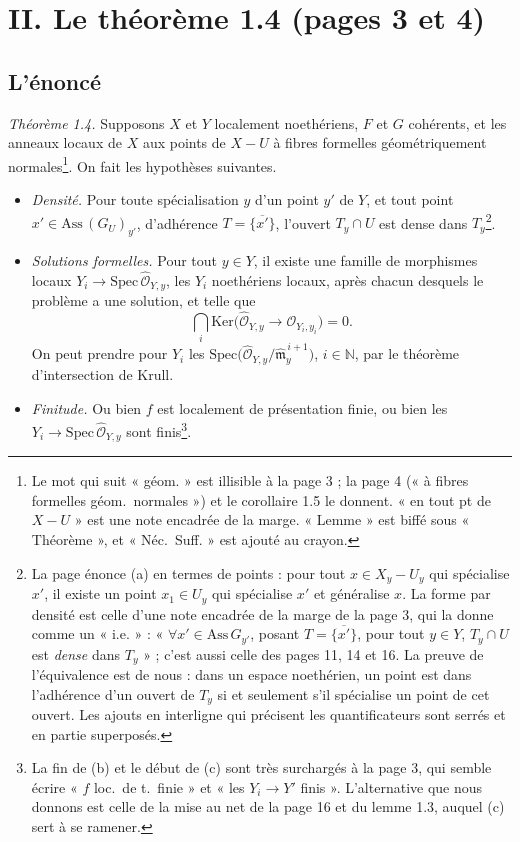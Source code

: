\documentclass[11pt,a4paper]{article}
\begin{document}
\section*{II. Le théorème 1.4 (pages 3 et 4)}

\subsection*{L'énoncé}

\emph{Théorème 1.4.} Supposons $X$ et $Y$ localement noethériens, $F$ et
$G$ cohérents, et les anneaux locaux de $X$ aux points de $X - U$ à fibres
formelles géométriquement normales\footnote{Le mot qui suit « géom. » est
illisible à la page 3 ; la page 4 (« à fibres formelles géom.\ normales ») et
le corollaire 1.5 le donnent. « en tout pt de $X - U$ » est une note encadrée
de la marge. « Lemme » est biffé sous « Théorème », et « Néc.\ Suff. » est
ajouté au crayon.}. On fait les hypothèses suivantes.

\begin{itemize}
  \item[(a)] \emph{Densité.} Pour toute spécialisation $y$ d'un point $y'$ de
  $Y$, et tout point $x' \in \mathrm{Ass}\,(G_U)_{y'}$, d'adhérence
  $T = \overline{\{x'\}}$, l'ouvert $T_y \cap U$ est dense dans
  $T_y$\footnote{La page énonce (a) en termes de points : pour tout
  $x \in X_y - U_y$ qui spécialise $x'$, il existe un point $x_1 \in U_y$ qui
  spécialise $x'$ et généralise $x$. La forme par densité est celle d'une note
  encadrée de la marge de la page 3, qui la donne comme un « i.e. » : « $\forall
  x' \in \mathrm{Ass}\, G_{y'}$, posant $T = \overline{\{x'\}}$, pour tout
  $y \in Y$, $T_y \cap U$ est \emph{dense} dans $T_y$ » ; c'est aussi celle
  des pages 11, 14 et 16. La preuve de l'équivalence est de nous : dans un
  espace noethérien, un point est dans l'adhérence d'un ouvert de $T_y$ si et
  seulement s'il spécialise un point de cet ouvert. Les ajouts en interligne qui
  précisent les quantificateurs sont serrés et en partie superposés.}.
  \item[(b)] \emph{Solutions formelles.} Pour tout $y \in Y$, il existe une
  famille de morphismes locaux $Y_i \to \mathrm{Spec}\,
  \widehat{\mathcal{O}}_{Y,y}$, les $Y_i$ noethériens locaux, après chacun
  desquels le problème a une solution, et telle que
  \[
    \bigcap_i \mathrm{Ker}\bigl(\widehat{\mathcal{O}}_{Y,y} \to
    \mathcal{O}_{Y_i, y_i}\bigr) = 0 .
  \]
  On peut prendre pour $Y_i$ les $\mathrm{Spec}\bigl(
  \widehat{\mathcal{O}}_{Y,y} / \widehat{\mathfrak{m}}_y^{\,i+1}\bigr)$,
  $i \in \mathbb{N}$, par le théorème d'intersection de Krull.
  \item[(c)] \emph{Finitude.} Ou bien $f$ est localement de présentation
  finie, ou bien les $Y_i \to \mathrm{Spec}\, \widehat{\mathcal{O}}_{Y,y}$
  sont finis\footnote{La fin de (b) et le début de (c) sont très surchargés à
  la page 3, qui semble écrire « $f$ loc.\ de t.\ finie » et « les $Y_i \to
  Y'$ finis ». L'alternative que nous donnons est celle de la mise au net de la
  page 16 et du lemme 1.3, auquel (c) sert à se ramener.}.
\end{itemize}
\end{document}
